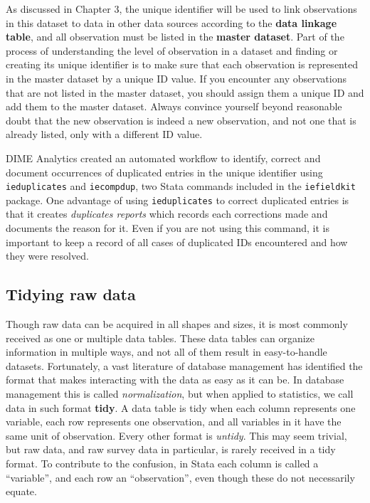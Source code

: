 As discussed in Chapter 3,
the unique identifier will be used to link observations in this dataset
to data in other data sources according to the \textbf{data linkage table},
and all observation must be listed in the \textbf{master dataset}.
Part of the process of understanding the level of observation in a dataset
and finding or creating its unique identifier is to
make sure that each observation is represented in the master dataset by a unique ID value.
If you encounter any observations that are not listed in the master dataset,
you should assign them a unique ID and add them to the master dataset.
Always convince yourself beyond reasonable doubt that the new observation
is indeed a new observation,
and not one that is already listed, only with a different ID value.

DIME Analytics created an automated workflow to identify, correct and document
occurrences of duplicated entries in the unique identifier using
\texttt{ieduplicates} and \texttt{iecompdup},
two Stata commands included in the \texttt{iefieldkit}
package.
One advantage of using \texttt{ieduplicates}
to correct duplicated entries is that it creates \textit{duplicates reports}
which records each corrections made and documents the reason for it.
Even if you are not using this command,
it is important to keep a record of all cases of duplicated IDs encountered
 and how they were resolved.

\subsection{Tidying raw data}

Though raw data can be acquired in all shapes and sizes,
it is most commonly received as one or multiple data tables.
These data tables can organize information in multiple ways,
and not all of them result in easy-to-handle datasets.
Fortunately, a vast literature of database management has identified the format
that makes interacting with the data as easy as it can be.
In database management this is called \textit{normalization},
but when applied to statistics, we call data in such format \textbf{tidy}.
A data table is tidy when each column represents one variable,
each row represents one observation,
and all variables in it have the same unit of observation.
Every other format is \textit{untidy}.
This may seem trivial, but raw data,
and raw survey data in particular,
is rarely received in a tidy format.
To contribute to the confusion,
in Stata each column is called a ``variable'',
and each row an ``observation'',
even though these do not necessarily equate.

